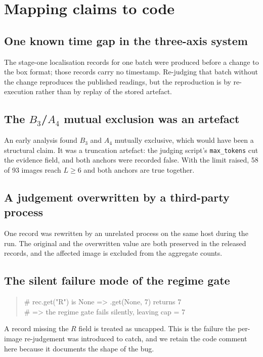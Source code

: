 \section{Mapping claims to code}
\label{app:code}

\subsection{One known time gap in the three-axis system}

The stage-one localisation records for one batch were produced before a change
to the box format; those records carry no timestamp. Re-judging that batch
without the change reproduces the published readings, but the reproduction is
by re-execution rather than by replay of the stored artefact.

\subsection{The $B_3$/$A_4$ mutual exclusion was an artefact}

An early analysis found $B_3$ and $A_4$ mutually exclusive, which would have
been a structural claim. It was a truncation artefact: the judging script's
\texttt{max\_tokens} cut the evidence field, and both anchors were recorded
false. With the limit raised, 58 of 93 images reach $L\ge6$ and both anchors
are true together.

\subsection{A judgement overwritten by a third-party process}

One record was rewritten by an unrelated process on the same host during the
run. The original and the overwritten value are both preserved in the released
records, and the affected image is excluded from the aggregate counts.

\subsection{The silent failure mode of the regime gate}

\begin{quote}\small\ttfamily
\# rec.get("R") is None  =>  .get(None, 7) returns 7\\
\# => the regime gate fails silently, leaving cap = 7
\end{quote}

A record missing the $R$ field is treated as uncapped. This is the failure the
per-image re-judgement was introduced to catch, and we
retain the code comment here because it documents the shape of the bug.

